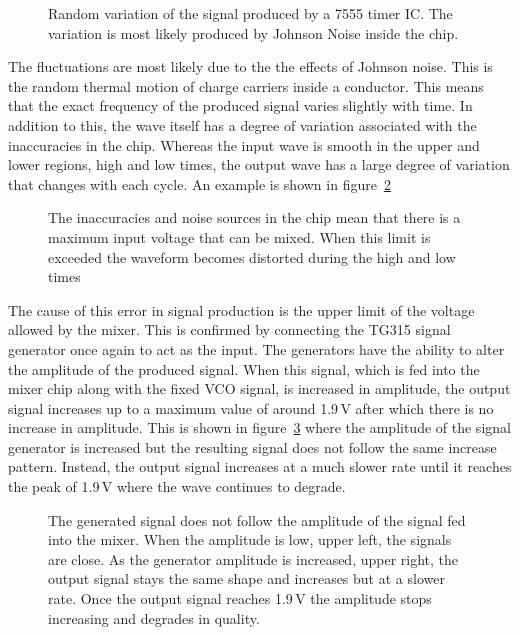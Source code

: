 \begin{figure}[htbp]
	\centering
		 
		\vspace{-10pt}
		\caption{Random variation of the signal produced by a 7555 timer IC. The variation is most likely produced by Johnson Noise inside the chip.}
		\label{fig:variations}
\end{figure} 

The fluctuations are most likely due to the the effects of Johnson noise. This is the random thermal motion of charge carriers inside a conductor\cite{Johnson28}. This means that the exact frequency of the produced signal varies slightly with time. In addition to this, the wave itself has a degree of variation associated with the inaccuracies in the chip. Whereas the input wave is smooth in the upper and lower regions, high and low times, the output wave has a large degree of variation that changes with each cycle. An example is shown in figure~\ref{fig:variations2}

\begin{figure}[htbp]
	\centering
		 
		\vspace{-20pt}
		\caption{The inaccuracies and noise sources in the chip mean that there is a maximum input voltage that can be mixed. When this limit is exceeded the waveform becomes distorted during the high and low times}
		\label{fig:variations2}
\end{figure} 

The cause of this error in signal production is the upper limit of the voltage allowed by the mixer. This is confirmed by connecting the TG315 signal generator once again to act as the input. The generators have the ability to alter the amplitude of the produced signal. When this signal, which is fed into the mixer chip along with the fixed VCO signal, is increased in amplitude, the output signal increases up to a maximum value of around 1.9\,V after which there is no increase in amplitude. This is shown in figure~\ref{fig:amplitude} where the amplitude of the signal generator is increased but the resulting signal does not follow the same increase pattern. Instead, the output signal increases at a much slower rate until it reaches the peak of 1.9\,V where the wave continues to degrade. 

\begin{figure}[htbp]
	\centering
		 
		\vspace{-20pt}
		\caption{The generated signal does not follow the amplitude of the signal fed into the mixer. When the amplitude is low, upper left, the signals are close. As the generator amplitude is increased, upper right, the output signal stays the same shape and increases but at a slower rate. Once the output signal reaches 1.9\,V the amplitude stops increasing and degrades in quality.}
		\label{fig:amplitude}
\end{figure} 

